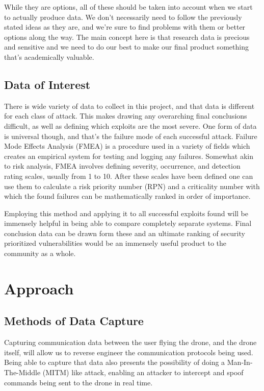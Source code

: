 \documentclass[IEEEtran,letterpaper,10pt,notitlepage,draftclsnofoot,onecolumn]{article}
\begin{document}
While they are options, all of these should be taken into account when we start to actually produce data. 
We don't necessarily need to follow the previously stated ideas as they are, and we're sure to find problems with them or better options along the way.
The main concept here is that research data is precious and sensitive and we need to do our best to make our final product something that's academically valuable.

\subsection{Data of Interest}
There is wide variety of data to collect in this project, and that data is different for each class of attack.
This makes drawing any overarching final conclusions difficult, as well as defining which exploits are the most severe.
One form of data is universal though, and that's the failure mode of each successful attack.
Failure Mode Effects Analysis (FMEA) is a procedure used in a variety of fields which creates an empirical system for testing and logging any failures.
Somewhat akin to risk analysis, FMEA involves defining severity, occurrence, and detection rating scales, usually from 1 to 10.
After these scales have been defined one can use them to calculate a risk priority number (RPN) and a criticality number with which the found failures can be mathematically ranked in order of importance. \cite{FMEA}

Employing this method and applying it to all successful exploits found will be immensely helpful in being able to compare completely separate systems.
Final conclusion data can be drawn form these and an ultimate ranking of security prioritized vulnerabilities would be an immensely useful product to the community as a whole. 

\section{Approach}
\subsection{Methods of Data Capture}
Capturing communication data between the user flying the drone, and the drone itself, will allow us to reverse engineer
the communication protocols being used. Being able to capture that data also presents the possibility of doing a
Man-In-The-Middle (MITM) like attack, enabling an attacker to intercept and spoof commands being sent to the drone
in real time.
\end{document}

